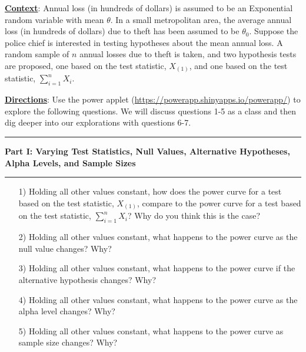 \documentclass{TISE}
\begin{document}
\textbf{\underline{Context}}: Annual loss (in hundreds of dollars) is assumed to be an Exponential random variable with mean $\theta$. In a small metropolitan area, the average annual loss (in hundreds of dollars) due to theft has been assumed to be $\theta_0$. Suppose the police chief is interested in testing hypotheses about the mean annual loss. A random sample of $n$ annual losses due to theft is taken, and two hypothesis tests are proposed, one based on the test statistic, $X_{(1)}$, and one based on the test statistic, $\sum_{i=1}^n X_i$.  

\textbf{\underline{Directions}}: Use the power applet (\url{https://powerapp.shinyapps.io/powerapp/}) to explore the following questions. We will discuss questions 1-5 as a class and then dig deeper into our explorations with questions 6-7.

\begin{center}
	\hrule 
	\textbf{Part I: Varying Test Statistics, Null Values, Alternative Hypotheses, Alpha Levels, and Sample Sizes}
	\hrule
\end{center}

\begin{enumerate}
	\item[1)] Holding all other values constant, how does the power curve for a test based on the test statistic, $X_{(1)}$, compare to the power curve for a test based on the test statistic, $\sum_{i=1}^n X_i$? Why do you think this is the case?
	
	\vspace{1.5in}
	
	\item[2)] Holding all other values constant, what happens to the power curve as the null value changes? Why?
	
	\vspace{1.5in}
	
	\item[3)] Holding all other values constant, what happens to the power curve if the alternative hypothesis changes? Why?
	
	\vspace{1.5in}
	
	\item[4)] Holding all other values constant, what happens to the power curve as the alpha level changes? Why? 
	
	\vspace{1.5in}
	
	\item[5)] Holding all other values constant, what happens to the power curve as sample size changes? Why?
	
	\vspace{1.5in}
\end{enumerate}
\end{document}
